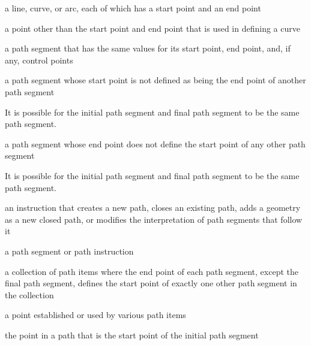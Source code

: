 
%
a line, \bezierlocal curve, or arc, each of which has a start point and an end point

%
a point other than the start point and end point that is used in defining a \bezierlocal curve

%
a path segment that has the same values for its start point, end point, and, if any, control points

%
a path segment whose start point is not defined as being the end point of another path segment
\begin{note}
It is possible for the initial path segment and final path segment to be the same path segment.
\end{note}

%
a path segment whose end point does not define the start point of any other path segment
\begin{note}
It is possible for the initial path segment and final path segment to be the same path segment.
\end{note}

%
an instruction that creates a new path, closes an existing path, adds a geometry as a new closed path, or modifies the interpretation of path segments that follow it

%
a path segment or path instruction

%
a collection of path items where the end point of each path segment, except the final path segment, defines the start point of exactly one other path segment in the collection

%
a point established or used by various path items

%
the point in a path that is the start point of the initial path segment

